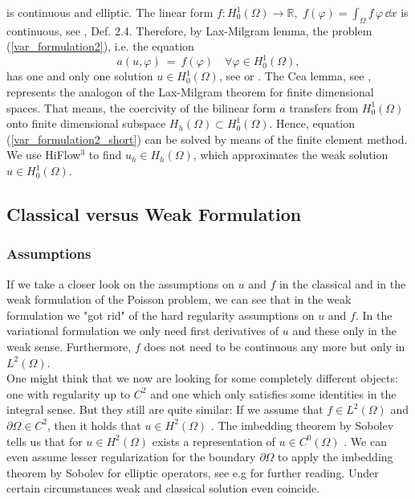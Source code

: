\documentclass[a4paper, 11pt, twoside]{article}
\begin{document}
is continuous and elliptic. The linear form $f: H^1_0(\Omega) \rightarrow \mathbb{R},$ $f(\varphi) = \int_\Omega f\, \varphi\, \dd x$ is continuous, 
see \cite{braess}, Def. 2.4. Therefore, by Lax-Milgram lemma, the problem (\ref{var_formulation2}), i.e. the equation 
\begin{equation}\label{var_formulation2_short}
a(u,\varphi)\ =\ f(\varphi) \quad \forall \varphi \in H^1_0(\Omega), 
\end{equation}
has one and only one solution $u \in H^1_0(\Omega)$, see \cite[Chap 5.8]{gilbarg} or \cite{mclean} . The Cea lemma, see \cite[Chap. 2.8, 2.5]{brenner}, represents the analogon of the Lax-Milgram theorem for finite dimensional spaces. 
That means, the coercivity of the bilinear form $a$ transfers from $H^1_0(\Omega)$ onto finite dimensional subspace $H_h(\Omega) \subset H^1_0(\Omega)$. 
Hence, equation (\ref{var_formulation2_short}) can be solved by means of the finite element method. 
We use HiFlow$^3$ to find $u_h \in H_h(\Omega)$, which approximates the weak solution $u\in H^1_0(\Omega)$.

\subsection{Classical versus Weak Formulation}
\subsubsection{Assumptions}
If we take a closer look on the assumptions on $u$ and $f$ in the classical and in the weak formulation of the Poisson problem, we can see that in the weak formulation we "got rid" of the hard regularity assumptions on $u$ and $f$. In the variational formulation we only need first derivatives of $u$ and these only in the weak sense. Furthermore, $f$ does not need to be continuous any more but only in $L^2(\Omega)$. \\
One might think that we now are looking for some completely different objects: one with regularity up to $C^2$ and one which only satisfies some identities in the integral sense. But they still are quite similar: If we assume that $f\in L^2(\Omega)$ and $\partial \Omega \in C^2$, then it holds that $u\in H^2(\Omega)$ \cite[Chap 6.3, Theorem 4]{evans}. The imbedding theorem by Sobolev tells us that for $u\in H^2(\Omega)$ exists a representation of $u \in C^0(\Omega)$ \cite[Chap 4]{Adams}. We can even assume lesser regularization for the boundary $\partial \Omega$ to apply the imbedding theorem by Sobolev for elliptic operators, see e.g \cite[Chap 9, Theorem 9.15]{gilbarg} for further reading. Under certain circumstances weak and classical solution even coincide.
\end{document}

